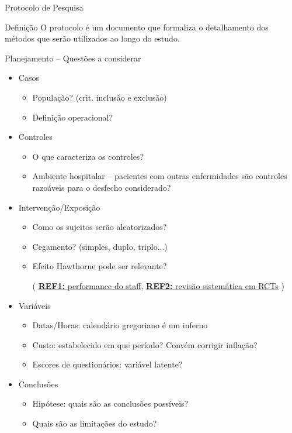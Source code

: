 \documentclass{beamer}
\begin{document}
\begin{frame}{Protocolo de Pesquisa}
  \begin{block}{Definição}
    \footnotesize
    O protocolo é um documento que formaliza o detalhamento dos métodos que serão utilizados ao longo do estudo.
  \end{block}
\end{frame}

\begin{frame}{Planejamento -- Questões a considerar}
  \begin{itemize}
    \footnotesize
  \item<1,2> Casos
    \begin{itemize}
      \scriptsize
    \item<2> População? (crit. inclusão e exclusão)
    \item<2> Definição operacional?
    \end{itemize}
  \item<1,3> Controles
    \scriptsize
    \begin{itemize}
      \scriptsize
    \item<3> O que caracteriza os controles?
    \item<3> Ambiente hospitalar -- pacientes com outras enfermidades são controles razoáveis para o desfecho considerado?
    \end{itemize}
  \item<1,4> Intervenção/Exposição
    \begin{itemize}
      \scriptsize
    \item<4> Como os sujeitos serão aleatorizados?
    \item<4> Cegamento? (simples, duplo, triplo...)
    \item<4> Efeito Hawthorne pode ser relevante?

      ({\tiny
        \href{https://doi.org/10.1001/jamainternmed.2016.9685}
        {{\bf REF1:} performance do staff},
        \href{https://doi.org/10.1016/j.jclinepi.2013.08.015}
        {{\bf REF2:} revisão sistemática em RCTs}
      })
    \end{itemize}
  \item<1,5> Variáveis
    \begin{itemize}
      \scriptsize
    \item<5> Datas/Horas: calendário gregoriano é um inferno
    \item<5> Custo: estabelecido em que período? Convém corrigir inflação?
    \item<5> Escores de questionários: variável latente?
    \end{itemize}
  \item<1,6> Conclusões
    \begin{itemize}
      \scriptsize
    \item<6> Hipótese: quais são as conclusões possíveis?
    \item<6> Quais são as limitações do estudo?
    \end{itemize}
  \end{itemize}
\end{frame}
\end{document}
